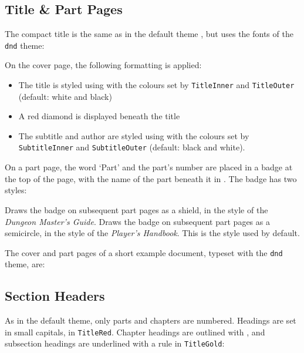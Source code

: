 				\newpage
		\subsection{Title \& Part Pages}\label{S:DndTitles}

			The compact title is the same as in the default theme , but uses the fonts of the \texttt{dnd} theme:


			On the cover page, the following formatting is applied:
			\begin{itemize}
				\item The title is styled using  with the colours set by \texttt{TitleInner} and \texttt{TitleOuter} (default: white and black)
				\item A red diamond is displayed beneath the title
				\item The subtitle and author are styled using  with the colours set by \texttt{SubtitleInner} and \texttt{SubtitleOuter} (default: black and white).
			\end{itemize}

			On a part page, the word `Part' and the part's number are placed in a badge at the top of the page, with the name of the part beneath it in . The badge has two styles:

			{
				Draws the badge on subsequent part pages as a shield, in the style of the \textit{Dungeon Master's Guide}.
			}
			{
				Draws the badge on subsequent part pages as a semicircle, in the style of the \textit{Player's Handbook}. This is the style used by default.
			}

			The cover and part pages of a short example document, typeset with the \texttt{dnd} theme, are:

		\subsection{Section Headers}

			As in the default theme, only parts and chapters are numbered. Headings are set in small capitals, in \texttt{TitleRed}. Chapter headings are outlined with , and subsection headings are underlined with a rule in \texttt{TitleGold}:

